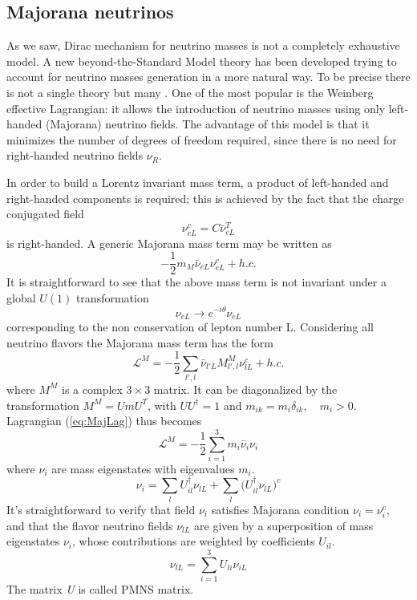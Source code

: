 \documentclass{subnucbo}
\begin{document}
\subsection{Majorana neutrinos}
As we saw, Dirac mechanism for neutrino masses is not a completely exhaustive model.
A new beyond-the-Standard Model theory has been developed trying to account for neutrino masses generation in a more natural way. To be precise there is not a single theory but many \cite{ref:Bronc}\cite{ref:Bil}\cite{ref:front}. 
One of the most popular is the Weinberg effective Lagrangian: it allows the introduction of neutrino masses using only left-handed (Majorana) neutrino fields.
The advantage of this model is that it minimizes the number of degrees of freedom required, since there is no need for right-handed neutrino fields $\nu_{R}$.

In order to build a Lorentz invariant mass term, a product of left-handed and right-handed components is required; this is achieved by the fact that the charge conjugated field
\begin{equation}
\nu_{eL}^c=C\bar{\nu}_{eL}^T
\end{equation}
is right-handed. A generic Majorana mass term may be written as
\begin{equation}
-\frac{1}{2}m_M\bar{\nu}_{eL}\nu_{eL}^c+h.c.
\end{equation}
It is straightforward to see that the above mass term is not invariant under a global $U(1)$ transformation
\begin{equation}
\nu_{eL}\rightarrow e^{-i\theta}\nu_{eL}
\end{equation}
corresponding to the non conservation of lepton number L.
Considering all neutrino flavors the Majorana mass term has the form
\begin{equation}
\label{eq:MajLag}
\mathcal{L}^M=-\frac{1}{2}\sum_{l',l}\bar{\nu}_{l'L}M_{l',l}^M\nu_{lL}^c+h.c.
\end{equation}
where $M^M$ is a complex $3\times3$ matrix. It can be diagonalized by the transformation $M^M=UmU^T$, with $UU^{\dagger}=1$ and  $m_{ik}=m_i\delta_{ik},\quad m_i>0$.
Lagrangian (\ref{eq:MajLag}) thus becomes
\begin{equation}
\mathcal{L}^M=-\frac{1}{2}\sum_{i=1}^3m_i\bar{\nu}_i\nu_i
\end{equation}
where $\nu_i$ are mass eigenstates with eigenvalues $m_i$.
\begin{equation}
\nu_i=\sum_lU_{il}^{\dagger}\nu_{lL}+\sum_l\bigl(U_{il}^{\dagger}\nu_{lL}\bigr)^c
\end{equation}
It's straightforward to verify that field $\nu_i$ satisfies Majorana condition $\nu_i=\nu_i^c$, and that the flavor neutrino fields $\nu_{lL}$ are given by a superposition of mass eigenstates $\nu_i$, whose contributions are weighted by coefficients $U_{il}$. 
\begin{equation}
\label{eq:nuMix}
\nu_{lL}=\sum_{i=1}^3U_{li}\nu_{iL}
\end{equation}
The matrix \emph{U} is called PMNS matrix.
\end{document}
